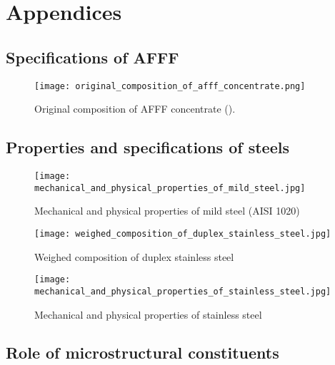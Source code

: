 \chapter*{Appendices}

\section*{Specifications of AFFF}
\begin{figure}[H]
    \texttt{[image: original\_composition\_of\_afff\_concentrate.png]}
    \caption{Original composition of AFFF concentrate (\cite{hinnant2020characterizing}).}
    \label{appendix:specifications}
\end{figure}

\section*{Properties and specifications of steels}
\begin{figure}[H]
    \texttt{[image: mechanical\_and\_physical\_properties\_of\_mild\_steel.jpg]}
    \caption{Mechanical and physical properties of mild steel (AISI 1020) \cite{kabir2020critical}}
    \label{appendix:carbon_steel_properties}
\end{figure}

\begin{figure}[H]
    \texttt{[image: weighed\_composition\_of\_duplex\_stainless\_steel.jpg]}
    \caption{Weighed composition of duplex stainless steel \cite{sourmail2005stainless}}
    \label{appendix:duplex_stainless_steel_properties}
\end{figure}

\begin{figure}[H]
    \texttt{[image: mechanical\_and\_physical\_properties\_of\_stainless\_steel.jpg]}
    \caption{Mechanical and physical properties of stainless steel \cite{bhadeshia2017steels}}
    \label{appendix:stainless_steel_properties}
\end{figure}

\section*{Role of microstructural constituents}

